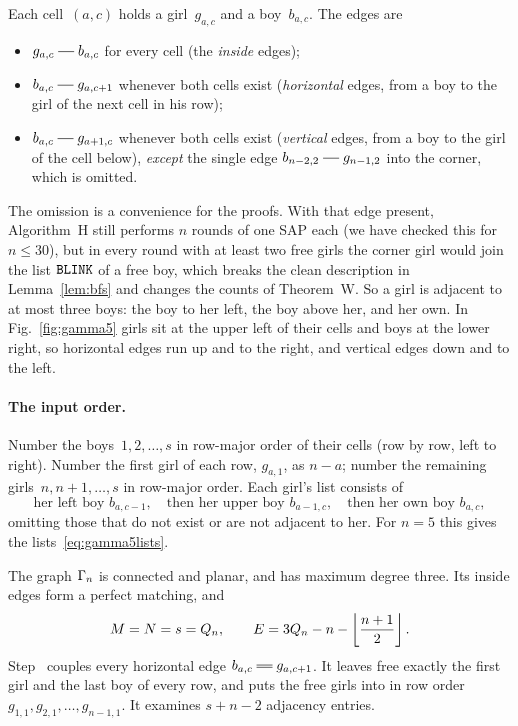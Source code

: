 Each cell~$(a,c)$ holds a girl~$g_{a,c}$ and a boy~$b_{a,c}$. The edges are
\begin{itemize}
\item $g_{a,c}\sg b_{a,c}$ for every cell (the \emph{inside} edges);
\item $b_{a,c}\sg g_{a,c+1}$ whenever both cells exist (\emph{horizontal}
  edges, from a boy to the girl of the next cell in his row);
\item $b_{a,c}\sg g_{a+1,c}$ whenever both cells exist (\emph{vertical}
  edges, from a boy to the girl of the cell below), \emph{except} the
  single edge $b_{n-2,2}\sg g_{n-1,2}$ into the corner, which is omitted.
\end{itemize}
The omission is a convenience for the proofs. With that edge present,
Algorithm~H still performs $n$ rounds of one SAP each (we have checked
this for $n\le30$), but in every round with at least two free girls the
corner girl would join the list $\texttt{BLINK}$ of a free boy, which breaks
the clean description in Lemma~\ref{lem:bfs} and changes the counts of
Theorem~W.
So a girl is adjacent to at most three boys: the boy to her left, the boy
above her, and her own. In Fig.~\ref{fig:gamma5} girls sit at the
upper left of their cells and boys at the lower right, so horizontal
edges run up and to the right, and vertical edges down and to the left.

\paragraph{The input order.}
Number the boys~$1,2,\ldots,s$ in row-major order of their cells (row by
row, left to right). Number the first girl of each row, $g_{a,1}$, as
$n-a$; number the remaining girls~$n,n+1,\ldots,s$ in row-major order.
Each girl's list consists of
\[
  \text{her left boy } b_{a,c-1},\quad\text{then her upper boy } b_{a-1,c},
  \quad\text{then her own boy } b_{a,c},
\]
omitting those that do not exist or are not adjacent to her. For $n=5$
this gives the lists~\eqref{eq:gamma5lists}.

\begin{proposition}
\label{prop:gamma}
The graph $\Gamma_n$ is connected and planar, and has maximum degree three.
Its inside edges form a perfect matching, and
\[
   M=N=s=Q_n,\qquad E=3Q_n-n-\left\lfloor\frac{n+1}2\right\rfloor.
\]
Step~ couples every horizontal edge $b_{a,c}\db g_{a,c+1}$. It leaves
free exactly the first girl and the last boy of every row, and puts the
free girls into  in row order~$g_{1,1},g_{2,1},\ldots,g_{n-1,1}$.
It examines $s+n-2$ adjacency entries.
\end{proposition}


